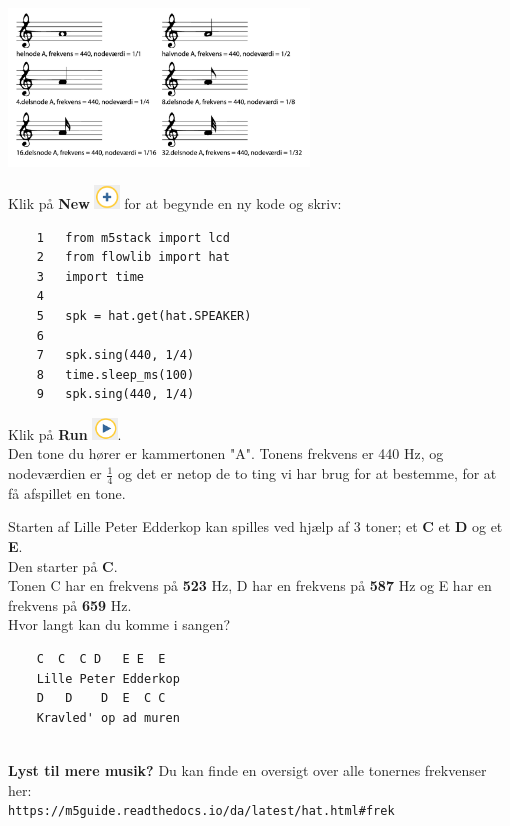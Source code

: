 \documentclass{ucph-handout}
\newcounter{handout}
\newcommand{\Ark}{Ark \#\arabic{handout} -- }
\begin{document}
\newpage

\renewcommand{\Title}{\Ark Lyd og lyt}
\begin{exercisebox}[adjusted title=Højtaler]

\includegraphics[width=0.6\textwidth]{billeder/toner.png}

Klik på \textbf{New}
\includegraphics[width=0.05\textwidth]{ikoner/new.png} for at begynde en ny kode og skriv:

\begin{verbatim}
    1   from m5stack import lcd
    2   from flowlib import hat
    3   import time
    4
    5   spk = hat.get(hat.SPEAKER)
    6
    7   spk.sing(440, 1/4)
    8   time.sleep_ms(100)
    9   spk.sing(440, 1/4)
\end{verbatim}

Klik på \textbf{Run} \includegraphics[width=0.05\textwidth]{ikoner/run.png}. \\

Den tone du hører er kammertonen "A". Tonens frekvens er 440 Hz, og nodeværdien er $\frac{1}{4}$ og det er netop de to ting vi har brug for at bestemme, for at få afspillet en tone. \\


Starten af Lille Peter Edderkop kan spilles ved hjælp af 3 toner; et \textbf{C} et \textbf{D} og et \textbf{E}.\\

Den starter på \textbf{C}.\\

Tonen C har en frekvens på \textbf{523} Hz, D har en frekvens på \textbf{587} Hz og E har en frekvens på \textbf{659} Hz. \\

Hvor langt kan du komme i sangen?\\

\begin{verbatim}
    C  C  C D   E E  E
    Lille Peter Edderkop
    D   D    D  E  C C 
    Kravled' op ad muren
\end{verbatim}\\

\textbf{Lyst til mere musik?} Du kan finde en oversigt over alle tonernes frekvenser her:\\
\nolinkurl{https://m5guide.readthedocs.io/da/latest/hat.html#frek}

\end{exercisebox}
\end{document}

